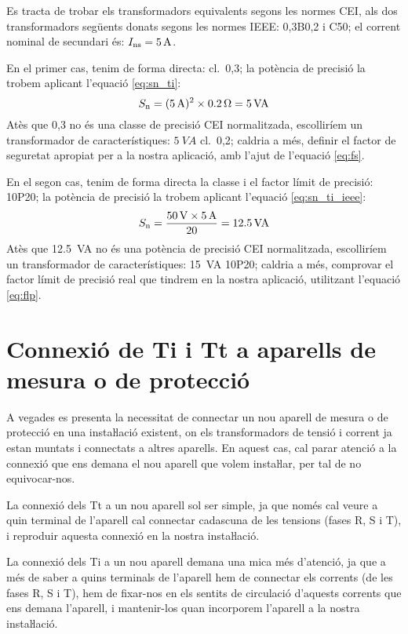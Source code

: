 \begin{exemple}[\TrafoIeeeEqCei{}]
	\addcontentsxms{\TrafoIeeeEqCei}
    Es tracta de trobar els transformadors equivalents segons les normes CEI, als dos
    transformadors següents donats segons les normes IEEE: 0,3B0,2 i
    C50; el corrent nominal de secundari és:    $I_\mathrm{ns}=\qty{5}{A}$.

    En el primer cas, tenim de forma directa: cl.~0,3; la potència de precisió la trobem
    aplicant l'equació \eqref{eq:sn_ti}:
    \[
        S_\mathrm{n} =(\qty{5}{A})^2 \times \qty{0,2}{\ohm} =  \qty{5}{VA}
    \]
    Atès que 0,3 no és una classe de precisió CEI normalitzada,
    escolliríem un transformador de característiques: $\qty{5}{VA}$ cl.~0,2; caldria a més, definir el factor de
    seguretat apropiat per a la nostra aplicació, amb l'ajut de l'equació \eqref{eq:fs}.

    En el segon cas, tenim de forma directa la classe i el factor límit de
    precisió: 10P20; la potència de precisió la trobem
    aplicant l'equació \eqref{eq:sn_ti_ieee}:
    \[
        S_\mathrm{n} = \frac{\qty{50}{V} \times\qty{5}{A}}{20} = \qty{12,5}{VA}
    \]
    Atès que \SI{12,5}{VA} no és una potència de precisió CEI normalitzada,
     escolliríem un transformador de característiques:
    \SI{15}{VA} 10P20; caldria a més, comprovar el factor límit de precisió real
    que tindrem en la nostra aplicació, utilitzant l'equació \eqref{eq:flp}.
\end{exemple}

\section{Connexió de Ti i Tt a aparells de mesura o de
protecció}\label{sec:conex_ti_tt}

A vegades es presenta la necessitat de connectar un nou aparell de
mesura o de protecció en una instaŀlació existent, on els
transformadors de tensió i corrent ja estan muntats i connectats a
altres aparells. En aquest cas, cal parar atenció a la connexió
que ens demana el nou aparell que volem instaŀlar, per tal de no
equivocar-nos.

La connexió dels Tt a un nou aparell sol ser simple, ja que només
cal veure a quin terminal de l'aparell cal connectar cadascuna de
les tensions (fases R, S i T), i reproduir aquesta connexió en la
nostra instaŀlació.

La connexió dels Ti a un nou aparell demana una mica més
d'atenció, ja que a més de saber a  quins terminals de l'aparell hem
de connectar els corrents (de les fases R, S i T), hem de fixar-nos
en els sentits de circulació d'aquests corrents que ens demana
l'aparell, i mantenir-los quan incorporem l'aparell a la nostra
instaŀlació.

